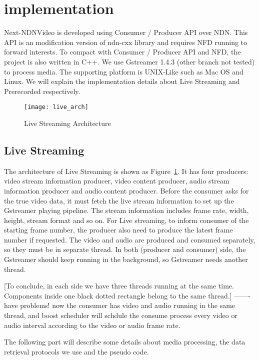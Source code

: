 \section{implementation} %
\label{sec:implementation}
Next-NDNVideo is developed using Consumer / Producer API over NDN. This API is an modification version of ndn-cxx library and requires NFD running to forward interests. To compact with Consumer / Producer API and NFD, the project is also written in C++. We use Gstreamer 1.4.3 (other branch not tested) to process media. The supporting platform is UNIX-Like such as Mac OS and Linux. We will explain the implementation details about Live Streaming and Prerecorded respectively.
\begin{figure}[htbp]
  \centering
  \texttt{[image: live\_arch]}
  \caption{Live Streaming Architecture}
  \label{fig:live_arch}
\end{figure}

\subsection{Live Streaming}
The architecture of Live Streaming is shown as Figure~\ref{fig:live_arch}. It has four producers: video stream information producer, video content producer, audio stream information producer and audio content producer. Before the consumer asks for the true video data, it must fetch the live stream information to set up the Gstreamer playing pipeline. The stream information includes frame rate, width, height, stream format and so on. For Live streaming, to inform consumer of the starting frame number, the producer also need to produce the latest frame number if requested. The video and audio are produced and consumed separately, so they must be in separate thread. In both (producer and consumer) side, the Gstreamer should keep running in the background, so Gstreamer needs another thread. 

[To conclude, in each side we have three threads running at the same time. Components inside one black dotted rectangle belong to the same thread.] ------- have problems! now the consumer has video and audio running in the same thread, and boost scheduler will schdule the consume process every video or audio interval according to the video or audio frame rate. 

The following part will describe some details about media processing, the data retrieval protocols we use and the pseudo code.
